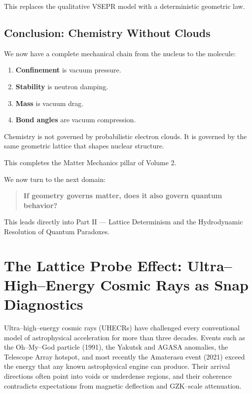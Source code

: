 \documentclass[11pt, letterpaper, openany]{book}
\begin{document}
This replaces the qualitative VSEPR model with a deterministic geometric law.

\section{Conclusion: Chemistry Without Clouds}

We now have a complete mechanical chain from the nucleus to the molecule:

\begin{enumerate}
    \item \textbf{Confinement} is vacuum pressure.
    \item \textbf{Stability} is neutron damping.
    \item \textbf{Mass} is vacuum drag.
    \item \textbf{Bond angles} are vacuum compression.
\end{enumerate}

Chemistry is not governed by probabilistic electron clouds.  
It is governed by the same geometric lattice that shapes nuclear structure.

This completes the Matter Mechanics pillar of Volume 2.

We now turn to the next domain:

\begin{quote}
\textbf{If geometry governs matter, does it also govern quantum behavior?}
\end{quote}

This leads directly into Part II — Lattice Determinism and the Hydrodynamic Resolution of Quantum Paradoxes.


\chapter{The Lattice Probe Effect: Ultra–High–Energy Cosmic Rays as Snap Diagnostics}
\label{chap:the_lattice_probe_effect}

Ultra–high–energy cosmic rays (UHECRs) have challenged every conventional model of
astrophysical acceleration for more than three decades. Events such as the
Oh–My–God particle (1991), the Yakutsk and AGASA anomalies, the Telescope Array
hotspot, and most recently the Amaterasu event (2021) exceed the energy that any
known astrophysical engine can produce. Their arrival directions often point into
voids or underdense regions, and their coherence contradicts expectations from
magnetic deflection and GZK–scale attenuation.
\end{document}
